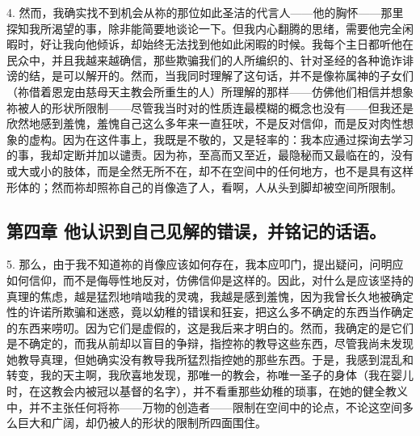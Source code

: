 4. 然而，我确实找不到机会从祢的那位如此圣洁的代言人——他的胸怀——那里探知我所渴望的事，除非能简要地谈论一下。但我内心翻腾的思绪，需要他完全闲暇时，好让我向他倾诉，却始终无法找到他如此闲暇的时候。我每个主日都听他在民众中，并且我越来越确信，那些欺骗我们的人所编织的、针对圣经的各种诡诈诽谤的结，是可以解开的。然而，当我同时理解了这句话，并不是像祢属神的子女们（祢借着恩宠由慈母天主教会所重生的人）所理解的那样——仿佛他们相信并想象祢被人的形状所限制——尽管我当时对的性质连最模糊的概念也没有——但我还是欣然地感到羞愧，羞愧自己这么多年来一直狂吠，不是反对信仰，而是反对肉性想象的虚构。因为在这件事上，我既是不敬的，又是轻率的：我本应通过探询去学习的事，我却定断并加以谴责。因为祢，至高而又至近，最隐秘而又最临在的，没有或大或小的肢体，而是全然无所不在，却不在空间中的任何地方，也不是具有这样形体的；然而祢却照祢自己的肖像造了人，看啊，人从头到脚却被空间所限制。\par


\subsection{第四章 他认识到自己见解的错误，并铭记的话语。}

5. 那么，由于我不知道祢的肖像应该如何存在，我本应叩门，提出疑问，问明应如何信仰，而不是侮辱性地反对，仿佛信仰是这样的。因此，对什么是应该坚持的真理的焦虑，越是猛烈地啃啮我的灵魂，我越是感到羞愧，因为我曾长久地被确定性的许诺所欺骗和迷惑，竟以幼稚的错误和狂妄，把这么多不确定的东西当作确定的东西来唠叨。因为它们是虚假的，这是我后来才明白的。然而，我确定的是它们是不确定的，而我从前却以盲目的争辩，指控祢的教导这些东西，尽管我尚未发现她教导真理，但她确实没有教导我所猛烈指控她的那些东西。于是，我感到混乱和转变，我的天主啊，我欣喜地发现，那唯一的教会，祢唯一圣子的身体（我在婴儿时，在这教会内被冠以基督的名字），并不看重那些幼稚的琐事，在她的健全教义中，并不主张任何将祢——万物的创造者——限制在空间中的论点，不论这空间多么巨大和广阔，却仍被人的形状的限制所四面围住。\par

